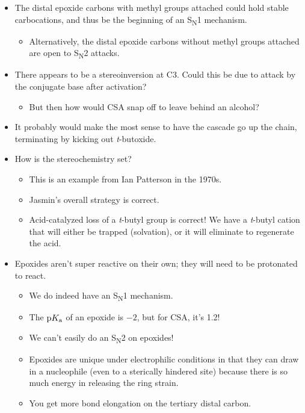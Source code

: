 \documentclass[../notes.tex]{subfiles}
\begin{document}
\begin{itemize}
\begin{figure}[h!]
        \label{fig:MPSet2Q1}
    \end{figure}
    \item The distal epoxide carbons with methyl groups attached could hold stable carbocations, and thus be the beginning of an S\textsubscript{N}1 mechanism.
    \begin{itemize}
        \item Alternatively, the distal epoxide carbons without methyl groups attached are open to S\textsubscript{N}2 attacks.
    \end{itemize}
    \item There appears to be a stereoinversion at C3. Could this be due to attack by the conjugate base after activation?
    \begin{itemize}
        \item But then how would CSA snap off to leave behind an alcohol?
    \end{itemize}
    \item It probably would make the most sense to have the cascade go up the chain, terminating by kicking out \emph{t}-butoxide.
    \item How is the stereochemistry set?
    \begin{itemize}
        \item This is an example from Ian Patterson in the 1970s.
        \item Jasmin's overall strategy is correct.
        \item Acid-catalyzed loss of a \emph{t}-butyl group is correct! We have a \emph{t}-butyl cation that will either be trapped (solvation), or it will eliminate to regenerate the acid.
    \end{itemize}
    \item Epoxides aren't super reactive on their own; they will need to be protonated to react.
    \begin{itemize}
        \item We do indeed have an S\textsubscript{N}1 mechanism.
        \item The $\textup{p}K_\textup{a}$ of an epoxide is $-2$, but for CSA, it's 1.2!
        \item We can't easily do an S\textsubscript{N}2 on epoxides!
        \item Epoxides are unique under electrophilic conditions in that they can draw in a nucleophile (even to a sterically hindered site) because there is so much energy in releasing the ring strain.
        \item You get more bond elongation on the tertiary distal carbon.

\end{itemize}
\end{itemize}
\end{document}
